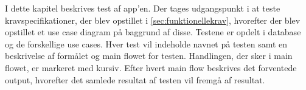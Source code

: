 I dette kapitel beskrives test af app'en. Der tages udgangspunkt i at teste kravspecifikationer, der blev opstillet i \autoref{sec:funktionellekrav}, hvorefter der blev opstillet et use case diagram på baggrund af disse. Testene er opdelt i database og de forskellige use cases. Hver test vil indeholde navnet på testen samt en beskrivelse af formålet og main flowet for testen. Handlingen, der sker i main flowet, er markeret med kursiv. Efter hvert main flow beskrives det forventede output, hvorefter det samlede resultat af testen vil fremgå af resultat.  
